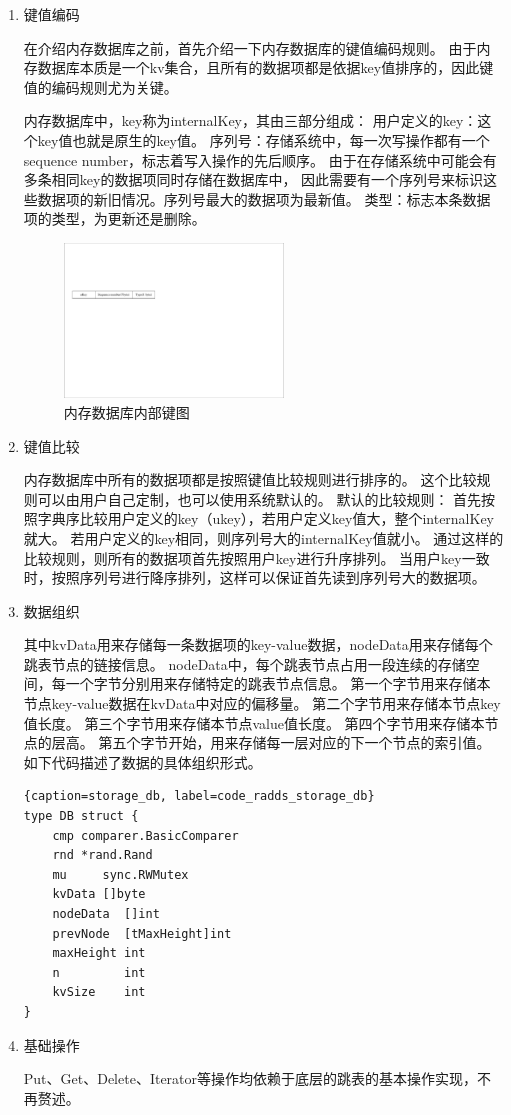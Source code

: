 		\begin{enumerate}
			\item 键值编码
			
			在介绍内存数据库之前，首先介绍一下内存数据库的键值编码规则。
			由于内存数据库本质是一个kv集合，且所有的数据项都是依据key值排序的，因此键值的编码规则尤为关键。

			内存数据库中，key称为internalKey，其由三部分组成：
			用户定义的key：这个key值也就是原生的key值。
			序列号：存储系统中，每一次写操作都有一个sequence number，标志着写入操作的先后顺序。
			由于在存储系统中可能会有多条相同key的数据项同时存储在数据库中，
			因此需要有一个序列号来标识这些数据项的新旧情况。序列号最大的数据项为最新值。
			类型：标志本条数据项的类型，为更新还是删除。

			\begin{figure}[H]
				\centering
				\includegraphics[width=0.55\textwidth]{pdf/internalkey}
				\caption{内存数据库内部键图}
				\label{internalkey}
			\end{figure}

			\item 键值比较
			
			内存数据库中所有的数据项都是按照键值比较规则进行排序的。
			这个比较规则可以由用户自己定制，也可以使用系统默认的。
			默认的比较规则：
			首先按照字典序比较用户定义的key（ukey），若用户定义key值大，整个internalKey就大。
			若用户定义的key相同，则序列号大的internalKey值就小。
			通过这样的比较规则，则所有的数据项首先按照用户key进行升序排列。
			当用户key一致时，按照序列号进行降序排列，这样可以保证首先读到序列号大的数据项。

			
			\item 数据组织
			
			
			其中kvData用来存储每一条数据项的key-value数据，nodeData用来存储每个跳表节点的链接信息。
			nodeData中，每个跳表节点占用一段连续的存储空间，每一个字节分别用来存储特定的跳表节点信息。
			第一个字节用来存储本节点key-value数据在kvData中对应的偏移量。
			第二个字节用来存储本节点key值长度。
			第三个字节用来存储本节点value值长度。
			第四个字节用来存储本节点的层高。
			第五个字节开始，用来存储每一层对应的下一个节点的索引值。
			如下代码描述了数据的具体组织形式。
						\begin{lstlisting}{caption=storage_db, label=code_radds_storage_db}
type DB struct {
	cmp comparer.BasicComparer
	rnd *rand.Rand
	mu     sync.RWMutex
	kvData []byte
	nodeData  []int
	prevNode  [tMaxHeight]int
	maxHeight int
	n         int
	kvSize    int
}
		\end{lstlisting}
		\item 基础操作
		
		Put、Get、Delete、Iterator等操作均依赖于底层的跳表的基本操作实现，不再赘述。
		\end{enumerate}

